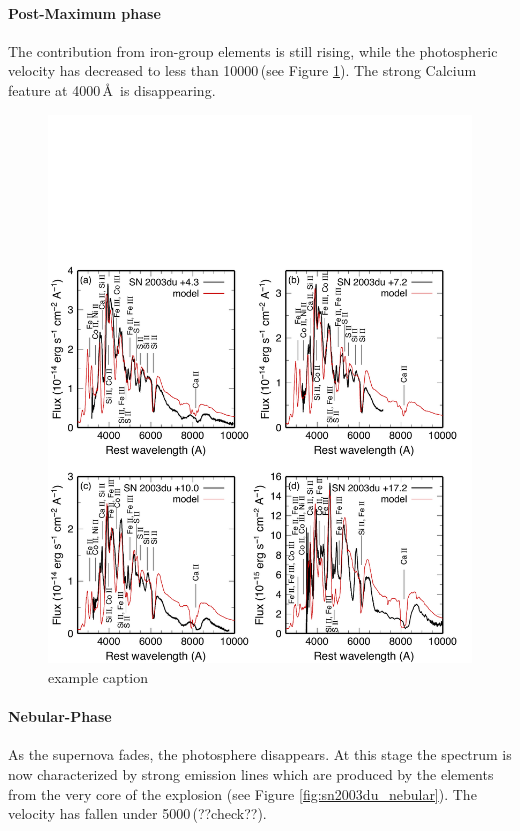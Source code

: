 \paragraph{Post-Maximum phase}
The contribution from iron-group elements is still rising, while the photospheric velocity has decreased to less than 10000\,\kms (see Figure \ref{fig:sn2003du_t+17}). The strong Calcium feature at 4000\,\AA\ is disappearing. 

\begin{figure}[htbp] %
   \centering
   \includegraphics[width=\textwidth]{chapter_intro/plots/sn2003du_t+17.pdf} 
   \caption{example caption}
   \label{fig:sn2003du_t+17}
\end{figure}


\paragraph{Nebular-Phase}
As the supernova fades, the photosphere disappears. At this stage the spectrum is now characterized by strong emission lines which are produced by the elements from the very core of the explosion (see Figure \ref{fig:sn2003du_nebular}). The velocity has fallen under 5000\,\kms (??check??). 

